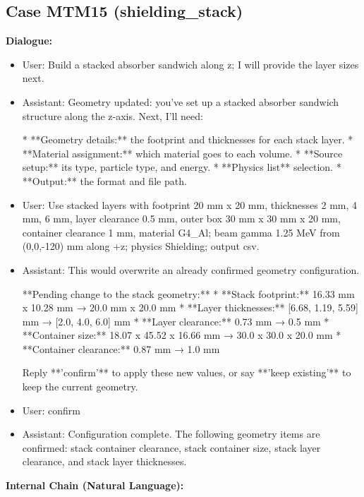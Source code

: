 \documentclass[11pt]{ctexart}
\begin{document}
\subsection{Case MTM15 (shielding\_stack)}
\textbf{Dialogue:}
\begin{itemize}
\item User: Build a stacked absorber sandwich along z; I will provide the layer sizes next.
\item Assistant: Geometry updated: you've set up a stacked absorber sandwich structure along the z-axis. Next, I'll need:

*   **Geometry details:** the footprint and thicknesses for each stack layer.
*   **Material assignment:** which material goes to each volume.
*   **Source setup:** its type, particle type, and energy.
*   **Physics list** selection.
*   **Output:** the format and file path.
\item User: Use stacked layers with footprint 20 mm x 20 mm, thicknesses 2 mm, 4 mm, 6 mm, layer clearance 0.5 mm, outer box 30 mm x 30 mm x 20 mm, container clearance 1 mm, material G4\_Al; beam gamma 1.25 MeV from (0,0,-120) mm along +z; physics Shielding; output csv.
\item Assistant: This would overwrite an already confirmed geometry configuration.

**Pending change to the stack geometry:**
*   **Stack footprint:** 16.33 mm x 10.28 mm → 20.0 mm x 20.0 mm
*   **Layer thicknesses:** [6.68, 1.19, 5.59] mm → [2.0, 4.0, 6.0] mm
*   **Layer clearance:** 0.73 mm → 0.5 mm
*   **Container size:** 18.07 x 45.52 x 16.66 mm → 30.0 x 30.0 x 20.0 mm
*   **Container clearance:** 0.87 mm → 1.0 mm

Reply **'confirm'** to apply these new values, or say **'keep existing'** to keep the current geometry.
\item User: confirm
\item Assistant: Configuration complete. The following geometry items are confirmed: stack container clearance, stack container size, stack layer clearance, and stack layer thicknesses.
\end{itemize}
\textbf{Internal Chain (Natural Language):}
\end{document}
